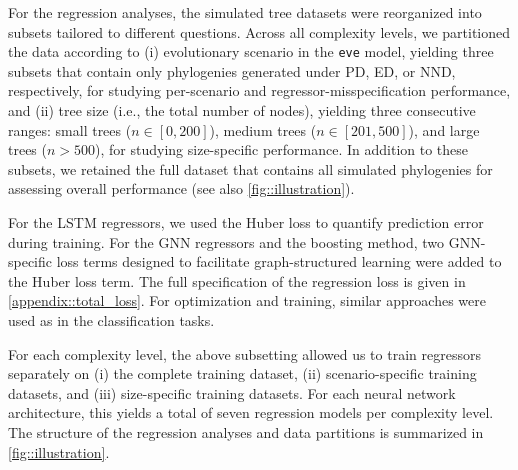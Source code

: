 {For the regression analyses, the simulated tree datasets were reorganized into subsets tailored to different questions. Across all complexity levels, we partitioned the data according to (i) evolutionary scenario in the \texttt{eve} model, yielding three subsets that contain only phylogenies generated under PD, ED, or NND, respectively, for studying per-scenario and regressor-misspecification performance, and (ii) tree size (i.e., the total number of nodes), yielding three consecutive ranges: small trees (\(n \in [0, 200]\)), medium trees (\(n \in [201, 500]\)), and large trees (\(n > 500\)), for studying size-specific performance. In addition to these subsets, we retained the full dataset that contains all simulated phylogenies for assessing overall performance (see also \autoref{fig::illustration}).

For the LSTM regressors, we used the Huber loss \citep{huber_robust_1992} to quantify prediction error during training. For the GNN regressors and the boosting method, two GNN-specific loss terms designed to facilitate graph-structured learning were added to the Huber loss term. The full specification of the regression loss is given in \autoref{appendix::total_loss}. For optimization and training, similar approaches were used as in the classification tasks.

For each complexity level, the above subsetting allowed us to train regressors separately on (i) the complete training dataset, (ii) scenario-specific training datasets, and (iii) size-specific training datasets. For each neural network architecture, this yields a total of seven regression models per complexity level. The structure of the regression analyses and data partitions is summarized in \autoref{fig::illustration}.

}
